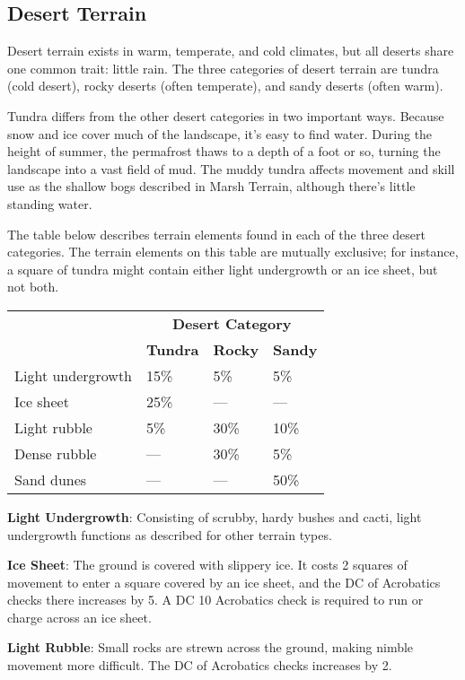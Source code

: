 \subsection{Desert Terrain}

				
Desert terrain exists in warm, temperate, and cold climates, but all deserts share one common trait: little rain. The three categories of desert terrain are tundra (cold desert), rocky deserts (often temperate), and sandy deserts (often warm).
				
Tundra differs from the other desert categories in two important ways. Because snow and ice cover much of the landscape, it's easy to find water. During the height of summer, the permafrost thaws to a depth of a foot or so, turning the landscape into a vast field of mud. The muddy tundra affects movement and skill use as the shallow bogs described in Marsh Terrain, although there's little standing water.
				
The table below describes terrain elements found in each of the three desert categories. The terrain elements on this table are mutually exclusive; for instance, a square of tundra might contain either light undergrowth or an ice sheet, but not both.

\begin{tabular}{llll}
 & \multicolumn{3}{c}{\textbf{Desert Category}}\\
 & \textbf{Tundra} & \textbf{Rocky} & \textbf{Sandy} \\
Light undergrowth & 15\% & 5\% & 5\%\\
Ice sheet & 25\% & --- & ---\\
Light rubble & 5\% & 30\% & 10\%\\
Dense rubble & --- & 30\% & 5\%\\
Sand dunes & --- & --- & 50\%\\
\end{tabular}

				
\textbf{Light Undergrowth}: Consisting of scrubby, hardy bushes and cacti, light undergrowth functions as described for other terrain types.
				
\textbf{Ice Sheet}: The ground is covered with slippery ice. It costs 2 squares of movement to enter a square covered by an ice sheet, and the DC of Acrobatics checks there increases by 5. A DC 10 Acrobatics check is required to run or charge across an ice sheet. 
				
\textbf{Light Rubble}: Small rocks are strewn across the ground, making nimble movement more difficult. The DC of Acrobatics checks increases by 2. 
				
